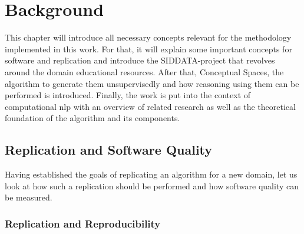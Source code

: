 \chapter{Background}

This chapter will introduce all necessary concepts relevant for the methodology implemented in this work. For that, it will explain some important concepts for software and replication and introduce the SIDDATA-project that revolves around the domain educational resources. After that, Conceptual Spaces, the algorithm to generate them unsupervisedly and how reasoning using them can be performed is introduced. Finally, the work is put into the context of computational \gls{nlp} with an overview of related research as well as the theoretical foundation of the algorithm and its components.




\section{Replication and Software Quality}

Having established the goals of replicating an algorithm for a new domain, let us look at how such a replication should be performed and how software quality can be measured.

\subsection{Replication and Reproducibility}
\label{sec:howtoreplicate}

